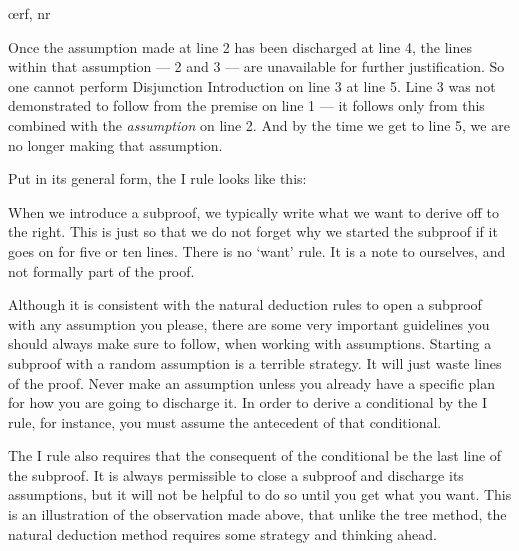\begin{ndproof}
	\open
		\oe{rf, nr}
	\close
\end{ndproof}

Once the assumption made at line 2 has been discharged at line 4, the lines within that assumption --- 2 and 3 --- are unavailable for further justification. So one cannot perform Disjunction Introduction on line 3 at line 5. Line 3 was not demonstrated to follow from the premise on line 1 --- it follows only from this combined with the \emph{assumption} on line 2. And by the time we get to line 5, we are no longer making that assumption.

Put in its general form, the {\eif}I rule looks like this:

\begin{ndproof}
	\open
		\metaA{} 
		\metaB{}
	\close
\end{ndproof}

When we introduce a subproof, we typically write what we want to derive off to the right. This is just so that we do not forget why we started the subproof if it goes on for five or ten lines. There is no `want' rule. It is a note to ourselves, and not formally part of the proof.

Although it is consistent with the natural deduction rules to open a subproof with any assumption you please, there are some very important guidelines you should always make sure to follow, when working with assumptions. Starting a subproof with a random assumption is a terrible strategy. It will just waste lines of the proof. Never make an assumption unless you already have a specific plan for how you are going to discharge it. In order to derive a conditional by the {\eif}I rule, for instance, you must assume the antecedent of that conditional.

The {\eif}I rule also requires that the consequent of the conditional be the last line of the subproof. It is always permissible to close a subproof and discharge its assumptions, but it will not be helpful to do so until you get what you want. This is an illustration of the observation made above, that unlike the tree method, the natural deduction method requires some strategy and thinking ahead.


